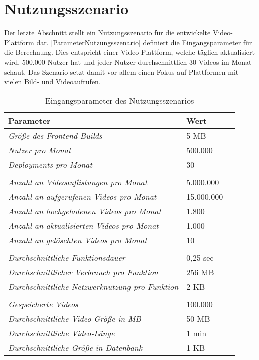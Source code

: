 \section{Nutzungsszenario}

Der letzte Abschnitt stellt ein Nutzungsszenario für die entwickelte Video-Plattform dar. \autoref{ParameterNutzungsszenario} definiert die Eingangsparameter für die Berechnung. Dies entspricht einer Video-Plattform, welche täglich aktualisiert wird,  500.000 Nutzer hat und jeder Nutzer durchschnittlich 30 Videos im Monat schaut. Das Szenario setzt damit vor allem einen Fokus auf Plattformen mit vielen Bild- und Videoaufrufen.

\begin{table}[h]
  \caption{Eingangsparameter des Nutzungsszenarios}
  \label{ParameterNutzungsszenario}
  \renewcommand{\arraystretch}{1.2}
  \centering
  \sffamily
  \begin{footnotesize}
    \begin{tabularx}{0.9\textwidth}{l l l}
      \toprule
      \textbf{Parameter} & \textbf{Wert}\\
      \midrule
      \emph{Größe des Frontend-Builds} & 5 MB \\
      \emph{Nutzer pro Monat} & 500.000 \\
      \emph{Deployments pro Monat } & 30 \\
       &  &  \\
      \emph{Anzahl an Videoauflistungen pro Monat} & 5.000.000 \\
      \emph{Anzahl an aufgerufenen Videos pro Monat} & 15.000.000 \\
      \emph{Anzahl an hochgeladenen Videos pro Monat} & 1.800 \\
      \emph{Anzahl an aktualisierten Videos pro Monat} & 1.000 \\
      \emph{Anzahl an gelöschten Videos pro Monat} & 10 \\
       &  &  \\
      \emph{Durchschnittliche Funktionsdauer} & 0,25 sec \\
      \emph{Durchschnittlicher Verbrauch pro Funktion} & 256 MB \\
      \emph{Durchschnittliche Netzwerknutzung pro Funktion} & 2 KB \\
       &  &  \\
      \emph{Gespeicherte Videos} & 100.000 \\
      \emph{Durchschnittliche Video-Größe in MB} & 50 MB \\
      \emph{Durchschnittliche Video-Länge} & 1 min \\
      \emph{Durchschnittliche Größe in Datenbank} & 1 KB \\
      \bottomrule
    \end{tabularx}
  \end{footnotesize}
  \rmfamily
\end{table}

